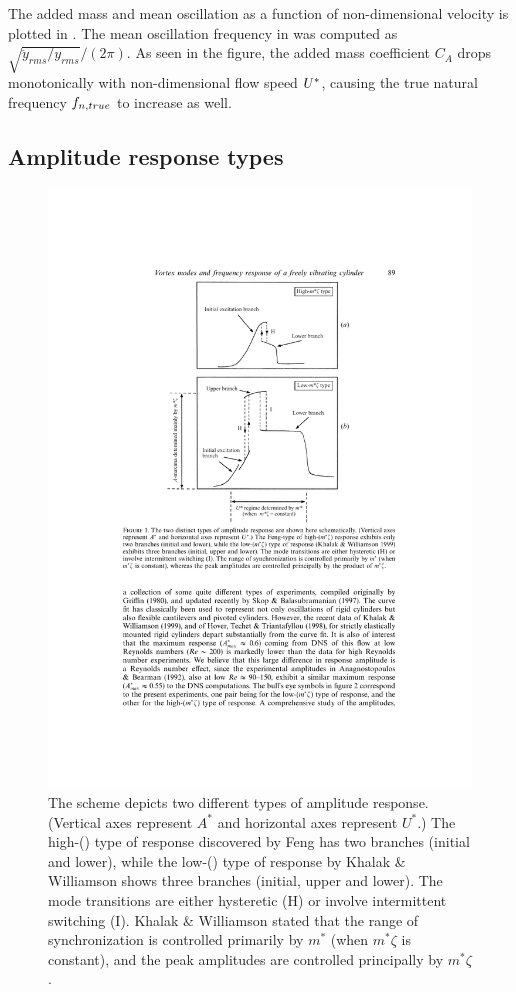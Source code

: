 
The added mass and mean oscillation as a function of non-dimensional velocity is plotted in  \cite{VIKESTAD2000}. The mean oscillation frequency in  was computed as $\sqrt{\ddot{y}_{rms}/y_{rms}}/(2\pi)$. As seen in the figure, the added mass coefficient $ C_A $ drops monotonically with non-dimensional flow speed $ U^* $, causing the true natural frequency $ f_{n,true} $ to increase as well. 




%


% 
\subsection{Amplitude response types}

\begin{figure}[b!]
	\centering
	\includegraphics[width=0.55\linewidth]{Figs/tworesponsetypes}
	\caption{The scheme depicts two different types of amplitude response. (Vertical axes represent $A^*$ and horizontal axes represent $U^*$.) The high-(\md{}) type of response discovered by Feng \cite{Feng1968} has two branches (initial and lower), while the low-(\md{}) type of response by Khalak \& Williamson \cite{KHALAK1999} shows three branches (initial, upper and lower). The mode transitions are either hysteretic (H) or involve intermittent switching (I). Khalak \& Williamson stated that the range of synchronization is controlled primarily by $m^*$ (when $m^*\zeta$ is constant), and the peak amplitudes are controlled principally by $m^*\zeta$.}
	\label{fig:tworesponsetypes}
\end{figure}


